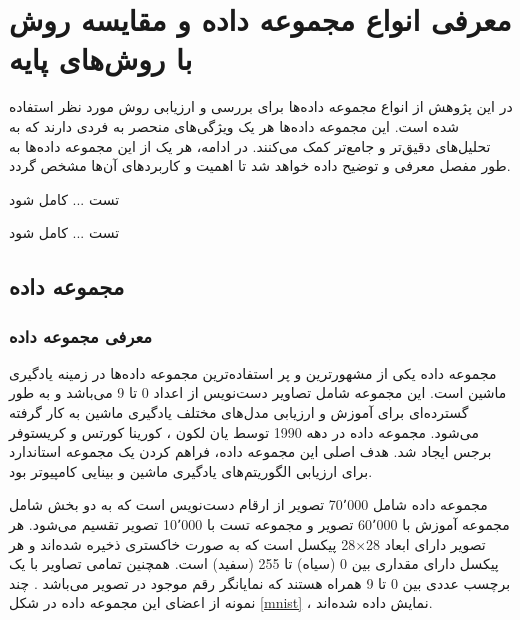 \section{
	معرفی انواع مجموعه داده و مقایسه روش
	با روش‌های پایه
}
در این پژوهش از انواع مجموعه داده‌ها برای بررسی و ارزیابی روش مورد نظر استفاده شده است. این مجموعه داده‌ها هر یک ویژگی‌های منحصر به فردی دارند که به تحلیل‌های دقیق‌تر و جامع‌تر کمک می‌کنند. در ادامه، هر یک از این مجموعه داده‌ها به طور مفصل معرفی و توضیح داده خواهد شد تا اهمیت و کاربردهای آن‌ها مشخص گردد.

تست ... کامل شود

تست ... کامل شود

\subsection{
مجموعه داده
}

\vspace{3mm}
\subsubsection{
	معرفی مجموعه داده
}\vspace{-1mm}

مجموعه داده
یکی از مشهورترین و پر استفاده‌ترین مجموعه داده‌ها در زمینه یادگیری ماشین است. این مجموعه شامل تصاویر دست‌نویس از اعداد 0 تا 9 می‌باشد و به طور گسترده‌ای برای آموزش و ارزیابی مدل‌های مختلف یادگیری ماشین به کار گرفته می‌شود.
مجموعه داده
در دهه 1990 توسط یان لکون%
،
کورینا کورتس%
و کریستوفر برجس%
 ایجاد شد. هدف اصلی این مجموعه داده، فراهم کردن یک مجموعه استاندارد برای ارزیابی الگوریتم‌های یادگیری ماشین و بینایی کامپیوتر بود.

مجموعه داده
شامل 70٬000 تصویر از ارقام دست‌نویس است که به دو بخش شامل مجموعه آموزش با 60٬000 تصویر و مجموعه تست با 10٬000 تصویر تقسیم می‌شود. هر تصویر دارای ابعاد
28$\times$28
پیکسل است که به صورت خاکستری%
ذخیره شده‌اند و هر پیکسل دارای مقداری بین 0 (سیاه) تا 255 (سفید) است. همچنین تمامی تصاویر با یک برچسب عددی بین 0 تا 9 همراه هستند که نمایانگر رقم موجود در تصویر می‌باشد
\cite{lecun1998gradient}.
چند نمونه از اعضای این مجموعه داده در شکل
\ref{mnist}%
، نمایش داده شده‌اند.

